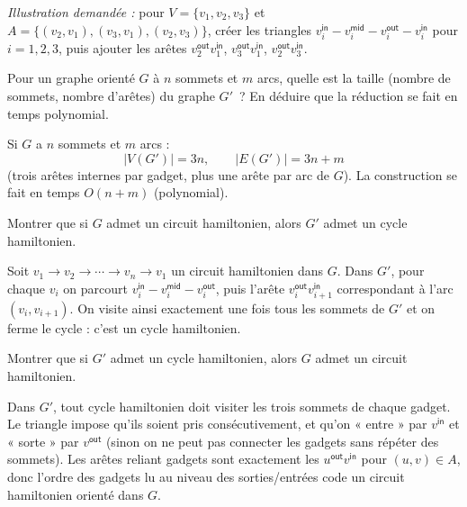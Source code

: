 \begin{exercice}[Le problème \textsc{Cycle Hamiltonien}\footnote{\textit{Source :} \url{https://www.youtube.com/watch?v=kl2k_wgYYic}.}]
\begin{correction}
    \emph{Illustration demandée :} pour $V=\{v_1,v_2,v_3\}$ et $A=\{(v_2,v_1),(v_3,v_1),(v_2,v_3)\}$, créer les triangles
    $v_i^{\mathsf{in}}-v_i^{\mathsf{mid}}-v_i^{\mathsf{out}}-v_i^{\mathsf{in}}$ pour $i=1,2,3$, puis ajouter les arêtes
    $v_2^{\mathsf{out}}v_1^{\mathsf{in}}$, $v_3^{\mathsf{out}}v_1^{\mathsf{in}}$, $v_2^{\mathsf{out}}v_3^{\mathsf{in}}$.
  \end{correction}

  \begin{question}
  \item Pour un graphe orienté $G$ à $n$ sommets et $m$ arcs, quelle est la taille (nombre de sommets, nombre d'arêtes) du graphe $G'$~?  
    En déduire que la réduction se fait en temps polynomial.
  \end{question}
  \begin{correction}
    Si $G$ a $n$ sommets et $m$ arcs :
    \[
    |V(G')| = 3n,\qquad |E(G')| = 3n + m
    \]
    (trois arêtes internes par gadget, plus une arête par arc de $G$).  
    La construction se fait en temps $O(n+m)$ (polynomial).
  \end{correction}

  \begin{question}
  \item Montrer que si $G$ admet un circuit hamiltonien, alors $G'$ admet un cycle hamiltonien.
  \end{question}
  \begin{correction}
    Soit $v_1\to v_2\to\cdots\to v_n\to v_1$ un circuit hamiltonien dans $G$. Dans $G'$, pour chaque $v_i$ on parcourt
    $v_i^{\mathsf{in}} - v_i^{\mathsf{mid}} - v_i^{\mathsf{out}}$, puis l'arête $v_i^{\mathsf{out}}v_{i+1}^{\mathsf{in}}$ correspondant à l'arc $(v_i,v_{i+1})$.  
    On visite ainsi exactement une fois tous les sommets de $G'$ et on ferme le cycle : c'est un cycle hamiltonien.
  \end{correction}

  \begin{question}
  \item Montrer que si $G'$ admet un cycle hamiltonien, alors $G$ admet un circuit hamiltonien.
  \end{question}
  \begin{correction}
    Dans $G'$, tout cycle hamiltonien doit visiter les trois sommets de chaque gadget. Le triangle impose qu'ils soient pris consécutivement, et qu'on « entre » par $v^{\mathsf{in}}$ et « sorte » par $v^{\mathsf{out}}$ (sinon on ne peut pas connecter les gadgets sans répéter des sommets).  
    Les arêtes reliant gadgets sont exactement les $u^{\mathsf{out}}v^{\mathsf{in}}$ pour $(u,v)\in A$, donc l'ordre des gadgets lu au niveau des sorties/entrées code un circuit hamiltonien orienté dans $G$.
  \end{correction}


\end{exercice}
